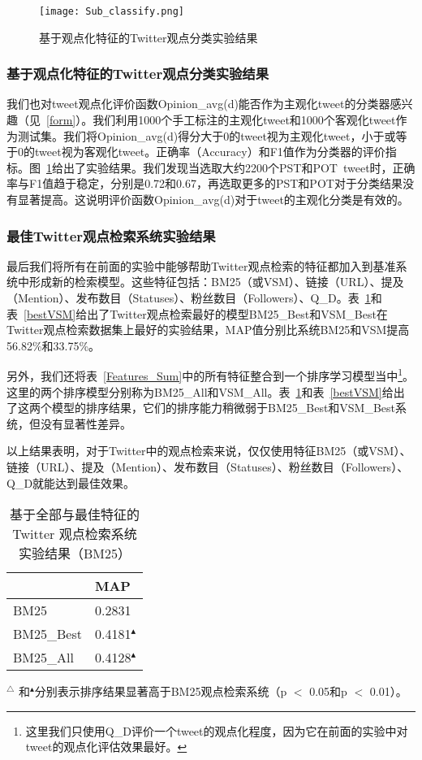\begin{figure}
\centering
\texttt{[image: Sub\_classify.png]}
\caption{基于观点化特征的Twitter观点分类实验结果}
\label{Sub_classify}
\end{figure}

\subsubsection{基于观点化特征的Twitter观点分类实验结果}
\label{STC}
我们也对tweet观点化评价函数Opinion\_{avg}(d)能否作为主观化tweet的分类器感兴趣（见~\ref{form}）。我们利用1000个手工标注的主观化tweet和1000个客观化tweet作为测试集。我们将Opinion\_{avg}(d)得分大于0的tweet视为主观化tweet，小于或等于0的tweet视为客观化tweet。正确率（Accuracy）和F1值作为分类器的评价指标。图~\ref{Sub_classify}给出了实验结果。我们发现当选取大约2200个PST和POT~tweet时，正确率与F1值趋于稳定，分别是0.72和0.67，再选取更多的PST和POT对于分类结果没有显著提高。这说明评价函数Opinion\_{avg}(d)对于tweet的主观化分类是有效的。


\subsubsection{最佳Twitter观点检索系统实验结果}
\label{AFE}

最后我们将所有在前面的实验中能够帮助Twitter观点检索的特征都加入到基准系统中形成新的检索模型。这些特征包括：BM25（或VSM）、链接（URL）、提及（Mention）、发布数目（Statuses）、粉丝数目（Followers）、Q\_D。表~\ref{bestBM25}和表~\ref{bestVSM}给出了Twitter观点检索最好的模型BM25\_Best和VSM\_Best在Twitter观点检索数据集上最好的实验结果，MAP值分别比系统BM25和VSM提高56.82\%和33.75\%。

另外，我们还将表~\ref{Features_Sum}中的所有特征整合到一个排序学习模型当中\footnote{这里我们只使用Q\_D评价一个tweet的观点化程度，因为它在前面的实验中对tweet的观点化评估效果最好。}。这里的两个排序模型分别称为BM25\_All和VSM\_All。表~\ref{bestBM25}和表~\ref{bestVSM}给出了这两个模型的排序结果，它们的排序能力稍微弱于BM25\_Best和VSM\_Best系统，但没有显著性差异。

以上结果表明，对于Twitter中的观点检索来说，仅仅使用特征BM25（或VSM）、链接（URL）、提及（Mention）、发布数目（Statuses）、粉丝数目（Followers）、Q\_D就能达到最佳效果。

\begin{table}
 \caption{基于全部与最佳特征的Twitter 观点检索系统实验结果（BM25）}
\label{bestBM25}
 \centering
 \begin{tabular}{|l l|}
 \hline
 & MAP \\
 \hline
BM25 & 0.2831\\
BM25\_Best & 0.4181$^\blacktriangle$\\
BM25\_All & 0.4128$^\blacktriangle$\\
 \hline
 \end{tabular}
      \begin{tablenotes}
        \footnotesize
\item $^\triangle$ 和$^\blacktriangle$分别表示排序结果显著高于BM25观点检索系统（p $<$ 0.05和p $<$ 0.01）。
\end{tablenotes}
\end{table}

